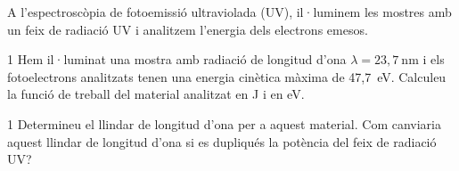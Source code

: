A l'espectroscòpia de fotoemissió ultraviolada (UV), il·luminem les mostres amb un feix de radiació UV i analitzem l'energia dels electrons emesos.

\begin{apartat}{1}
Hem il·luminat una mostra amb radiació de longitud d'ona $\lambda = 23,7\ \mathrm{nm}$ i els fotoelectrons analitzats tenen una energia cinètica màxima de 47,7~eV. Calculeu la funció de treball del material analitzat en J i en eV.
\end{apartat}

\begin{apartat}{1}
Determineu el llindar de longitud d'ona per a aquest material. Com canviaria aquest llindar de longitud d'ona si es dupliqués la potència del feix de radiació UV?
\end{apartat}

